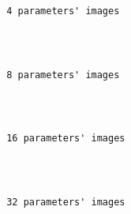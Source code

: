 \documentclass[11pt]{article}
\begin{document}
    \begin{Verbatim}[commandchars=\\\{\}]

 4 parameters' images

    \end{Verbatim}

    \begin{center}
    \end{center}
    { \hspace*{\fill} \\}
    
    \begin{Verbatim}[commandchars=\\\{\}]

 8 parameters' images

    \end{Verbatim}

    \begin{center}
    \end{center}
    { \hspace*{\fill} \\}
    
    \begin{Verbatim}[commandchars=\\\{\}]

 16 parameters' images

    \end{Verbatim}

    \begin{center}
    \end{center}
    { \hspace*{\fill} \\}
    
    \begin{Verbatim}[commandchars=\\\{\}]

 32 parameters' images

    \end{Verbatim}

    \begin{center}
    \end{center}
    { \hspace*{\fill} \\}
    
\end{document}
